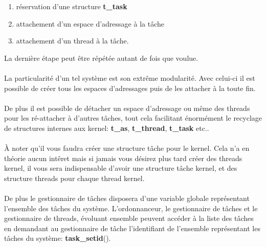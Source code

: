 \documentclass[10pt,a4wide]{article}
\begin{document}
\begin{enumerate}

\item r\'eservation d'une structure \textbf{t\_task}

\item attachement d'un espace d'adressage \`a la t\^ache

\item attachement d'un thread \`a la t\^ache.

\end{enumerate}

La derni\`ere \'etape peut \^etre r\'ep\'et\'ee autant de fois que voulue.

\paragraph{}

La particularit\'e d'un tel syst\`eme est son extr\^eme modularit\'e. Avec
celui-ci il est possible de cr\'eer tous les espaces d'adressages puis
de les attacher \`a la toute fin.

\paragraph{}

De plus il est possible de d\'etacher un espace d'adressage ou m\^eme
des threads pour les r\'e-attacher \`a d'autres t\^aches, tout cela
facilitant \'enorm\'ement le recyclage de structures internes aux
kernel: \textbf{t\_as}, \textbf{t\_thread}, \textbf{t\_task} etc..

\paragraph{}

\`A noter qu'il vous faudra cr\'eer une structure t\^ache pour le kernel.
Cela n'a en th\'eorie aucun int\^eret mais si jamais vous d\'esirez plus
tard cr\'eer des threads kernel, il vous sera indispensable d'avoir une
structure t\^ache kernel, et des structure threads pour chaque thread
kernel.

\paragraph{}

De plus le gestionnaire de t\^aches disposera d'une variable globale
repr\'esentant l'ensemble des t\^aches du syst\`eme. L'ordonnanceur,
le gestionnaire de t\^aches et le gestionnaire de threads, \'evoluant
ensemble peuvent acc\'eder \`a la liste des t\^aches en demandant
au gestionnaire de t\^ache l'identifiant de l'ensemble repr\'esentant
les t\^aches du syst\`eme: \textbf{task\_setid}().
\end{document}

